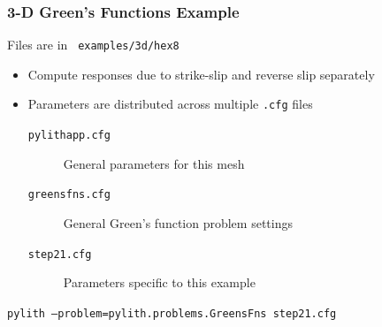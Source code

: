 \documentclass{beamer}
\begin{document}
\begin{frame}
  \frametitle{3-D Green's Functions Example}

  \vfill
  Files are in {\tt\color{red} examples/3d/hex8}
  \vfill

  \begin{itemize}
  \item Compute responses due to strike-slip and reverse slip separately
  \item Parameters are distributed across multiple {\tt .cfg} files
    \begin{description}
    \item[{\tt pylithapp.cfg}] General parameters for this mesh
    \item[{\tt greensfns.cfg}] General Green's function problem settings
    \item[{\tt step21.cfg}] Parameters specific to this example
    \end{description}
  \end{itemize}

  \vfill
  {\tt pylith --problem=pylith.problems.GreensFns step21.cfg}
  \vfill
  
\end{frame}




\end{document}
